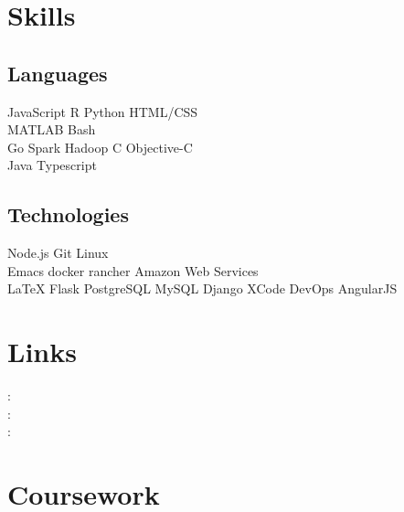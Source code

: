 \documentclass[]{deedy-resume-openfont}
\begin{document}
\begin{minipage}[t]{0.33\textwidth}
\section{Skills}
\subsection{Languages}
JavaScript \textbullet{} R \textbullet{} Python \textbullet{} HTML/CSS \\
MATLAB \textbullet{} Bash\\
Go \textbullet{} Spark \textbullet{} Hadoop \textbullet{} C \textbullet{} Objective-C \\
Java \textbullet{} Typescript\\
\sectionsep

\subsection{Technologies}
Node.js \textbullet{} Git \textbullet{} Linux \\
Emacs \textbullet{} docker \textbullet{} rancher \textbullet{} Amazon Web Services\\
LaTeX \textbullet{} Flask \textbullet{} PostgreSQL \textbullet{} MySQL
Django \textbullet{}  XCode \textbullet{} DevOps \textbullet{} AngularJS \textbullet{}
\sectionsep


\section{Links}
: \href{https://github.com/prajnak}{} \\
: \href{https://www.linkedin.com/in/prajnak}{} \\
:  \href{https://prajis.me}{} \\
\sectionsep


\section{Coursework}

\end{minipage}
\end{document}
